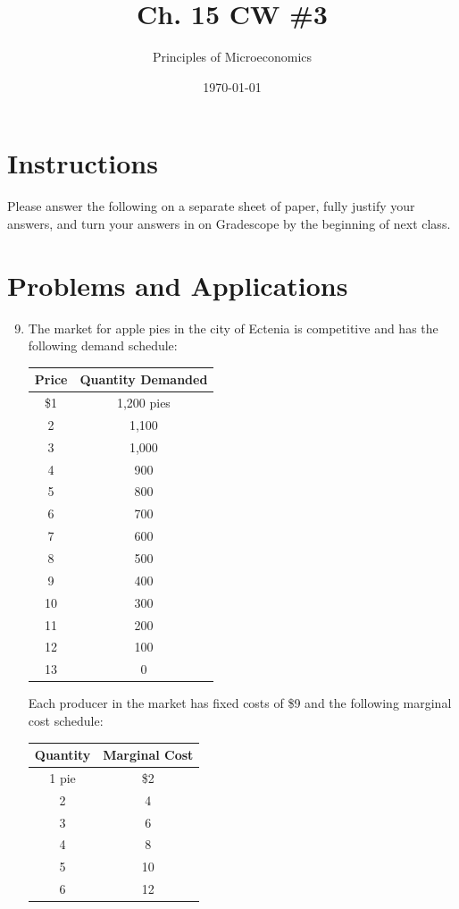 \documentclass{article}
\title{Ch. 15 CW \#3}
\author{Principles of Microeconomics}
\date{\today}
\begin{document}
\maketitle

\section*{Instructions} Please answer the following on a separate sheet of paper, fully justify your answers, and turn your answers in on Gradescope by the beginning of next class.

\section*{Problems and Applications}

\begin{enumerate}

\setcounter{enumi}{8}
\item The market for apple pies in the city of Ectenia is competitive and has the following demand schedule:

	\begin{center}
	\begin{tabular}{c | c}
	Price & Quantity Demanded \\
	\hline
	\$1 & 1,200 pies \\
	2 & 1,100 \\
	3 & 1,000 \\
	4 & 900 \\
	5 & 800 \\
	6 & 700 \\
	7 & 600 \\
	8 & 500 \\
	9 & 400 \\
	10 & 300 \\
	11 & 200 \\
	12 & 100 \\
	13 & 0
	\end{tabular}
	\end{center}
	
	Each producer in the market has fixed costs of \$9 and the following marginal cost schedule:
	
	\begin{center}
	\begin{tabular}{c | c}
	Quantity & Marginal Cost \\
	\hline
	1 pie & \$2 \\
	2 & 4 \\
	3 & 6 \\
	4 & 8 \\
	5 & 10 \\
	6 & 12
	\end{tabular}
	\end{center}
	

\end{enumerate}
\end{document}
